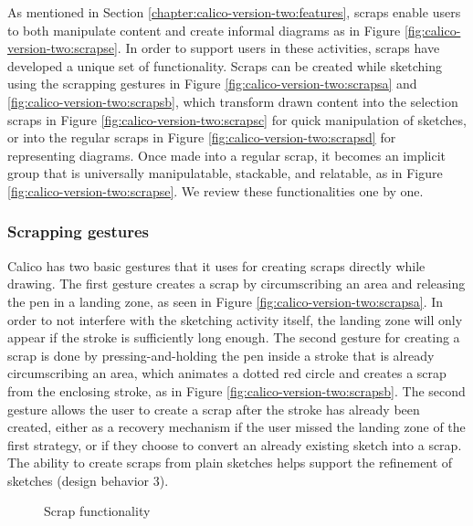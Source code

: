 \documentclass[12pt,fleqn]{ucithesis}
\begin{document}
As mentioned in Section \ref{chapter:calico-version-two:features}, scraps enable users to both manipulate content and create informal diagrams as in Figure \ref{fig:calico-version-two:scrapse}. In order to support users in these activities, scraps have developed a unique set of functionality. Scraps can be created while sketching using the scrapping gestures in Figure \ref{fig:calico-version-two:scrapsa} and \ref{fig:calico-version-two:scrapsb}, which transform drawn content into the selection scraps in Figure \ref{fig:calico-version-two:scrapsc} for quick manipulation of sketches, or into the regular scraps in Figure \ref{fig:calico-version-two:scrapsd} for representing diagrams. Once made into a regular scrap, it becomes an implicit group that is universally manipulatable, stackable, and relatable, as in Figure \ref{fig:calico-version-two:scrapse}. We review these functionalities one by one.

\subsubsection{Scrapping gestures} Calico has two basic gestures that it uses for creating scraps directly while drawing. The first gesture creates a scrap by circumscribing an area and releasing the pen in a landing zone, as seen in Figure \ref{fig:calico-version-two:scrapsa}. In order to not interfere with the sketching activity itself, the landing zone will only appear if the stroke is sufficiently long enough. The second gesture for creating a scrap is done by pressing-and-holding the pen inside a stroke that is already circumscribing an area, which animates a dotted red circle and creates a scrap from the enclosing stroke, as in Figure \ref{fig:calico-version-two:scrapsb}. The second gesture allows the user to create a scrap after the stroke has already been created, either as a recovery mechanism if the user missed the landing zone of the first strategy, or if they choose to convert an already existing sketch into a scrap. The ability to create scraps from plain sketches helps support the refinement of sketches (design behavior 3).

\begin{figure}%
  \centering
   \caption {Scrap functionality}
   \label{fig:calico-version-two:scraps}
\end{figure}%
\end{document}
